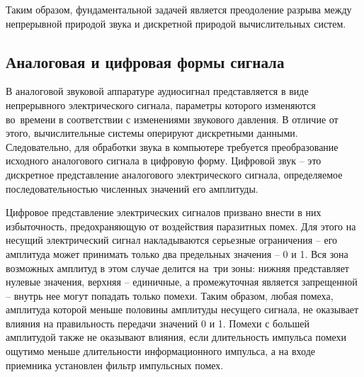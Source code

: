 \documentclass{ou}
\begin{document}
Таким образом, фундаментальной задачей является преодоление разрыва между непрерывной природой звука и дискретной природой вычислительных систем.
\subsection{Аналоговая и цифровая формы сигнала}
В аналоговой звуковой аппаратуре аудиосигнал представляется в виде непрерывного электрического сигнала, параметры которого изменяются во~времени в соответствии с изменениями звукового давления. В отличие от этого, вычислительные системы оперируют дискретными данными. Следовательно, для обработки звука в компьютере требуется преобразование исходного аналогового сигнала в цифровую форму. Цифровой звук -- это дискретное представление аналогового электрического сигнала, определяемое последовательностью численных значений его амплитуды\cite{ixbt}. 

Цифровое представление электрических сигналов призвано внести в них избыточность, предохраняющую от воздействия паразитных помех. Для этого на несущий электрический сигнал накладываются серьезные ограничения -- его амплитуда может принимать только два предельных значения -- 0 и 1. Вся зона возможных амплитуд в этом случае делится на~три зоны: нижняя представляет нулевые значения, верхняя -- единичные, а промежуточная является запрещенной -- внутрь нее могут попадать только помехи. Таким образом, любая помеха, амплитуда которой меньше половины амплитуды несущего сигнала, не оказывает влияния на правильность передачи значений 0 и 1. Помехи с большей амплитудой также не оказывают влияния, если длительность импульса помехи ощутимо меньше длительности информационного импульса, а на входе приемника установлен фильтр импульсных помех.
\end{document}

